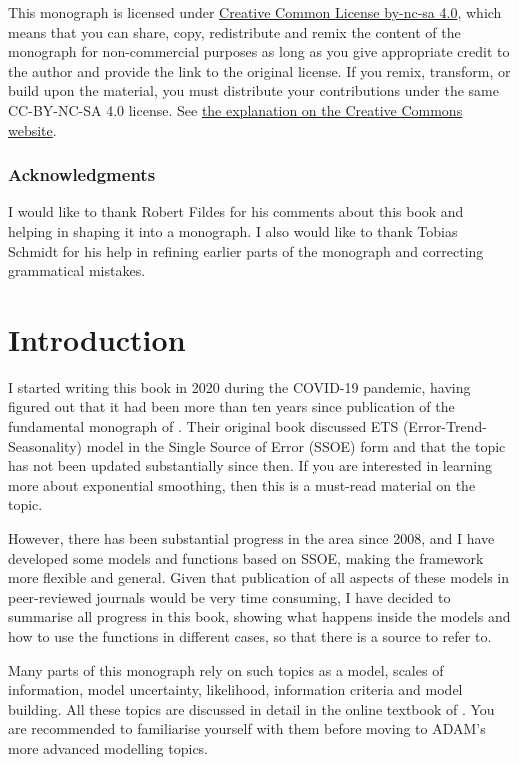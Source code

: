 \documentclass[
]{book}
\theoremstyle{definition}
\theoremstyle{definition}
\theoremstyle{definition}
\theoremstyle{definition}
\theoremstyle{remark}
\begin{document}
This monograph is licensed under \href{https://creativecommons.org/licenses/by-nc-sa/4.0/}{Creative Common License by-nc-sa 4.0}, which means that you can share, copy, redistribute and remix the content of the monograph for non-commercial purposes as long as you give appropriate credit to the author and provide the link to the original license. If you remix, transform, or build upon the material, you must distribute your contributions under the same CC-BY-NC-SA 4.0 license. See \href{https://creativecommons.org/licenses/by-nc-sa/4.0/}{the explanation on the Creative Commons website}.

\hypertarget{acknowledgments}{%
\subsection*{Acknowledgments}\label{acknowledgments}}

I would like to thank Robert Fildes for his comments about this book and helping in shaping it into a monograph. I also would like to thank Tobias Schmidt for his help in refining earlier parts of the monograph and correcting grammatical mistakes.

\hypertarget{intro}{%
\chapter{Introduction}\label{intro}}

I started writing this book in 2020 during the COVID-19 pandemic, having figured out that it had been more than ten years since publication of the fundamental monograph of \citet{Hyndman2008b}. Their original book discussed ETS (Error-Trend-Seasonality) model in the Single Source of Error (SSOE) form and that the topic has not been updated substantially since then. If you are interested in learning more about exponential smoothing, then this is a must-read material on the topic.

However, there has been substantial progress in the area since 2008, and I have developed some models and functions based on SSOE, making the framework more flexible and general. Given that publication of all aspects of these models in peer-reviewed journals would be very time consuming, I have decided to summarise all progress in this book, showing what happens inside the models and how to use the functions in different cases, so that there is a source to refer to.

Many parts of this monograph rely on such topics as a model, scales of information, model uncertainty, likelihood, information criteria and model building. All these topics are discussed in detail in the online textbook of \citet{SvetunkovSBA}. You are recommended to familiarise yourself with them before moving to ADAM's more advanced modelling topics.
\end{document}
